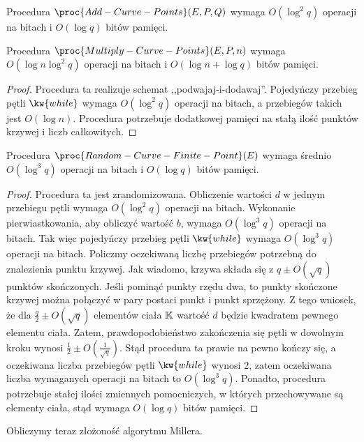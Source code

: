 \begin{fact}
Procedura $\proc{Add-Curve-Points}(E, P, Q)$ wymaga
$O(\log^2 q)$ operacji na bitach i $O(\log q)$ bitów pamięci.
\end{fact}

\begin{lemma}
Procedura $\proc{Multiply-Curve-Points}(E, P, n)$ wymaga
$O(\log n \log^2 q)$ operacji na bitach i $O(\log n + \log q)$ bitów pamięci.
\end{lemma}

\begin{proof}
Procedura ta realizuje schemat ,,podwajaj-i-dodawaj''.
Pojedyńczy przebieg pętli $\kw{while}$ wymaga
$O(\log^2 q)$ operacji na bitach,
a przebiegów takich jest $O(\log n)$.
Procedura potrzebuje dodatkowej pamięci na stałą ilość
punktów krzywej i liczb całkowitych.
\end{proof}

\begin{lemma}
Procedura $\proc{Random-Curve-Finite-Point}(E)$ wymaga
średnio $O(\log^3 q)$ operacji na bitach i $O(\log q)$ bitów pamięci.
\end{lemma}

\begin{proof}
Procedura ta jest zrandomizowana.
Obliczenie wartości $d$ w jednym przebiegu pętli wymaga
$O(\log^2 q)$ operacji na bitach.
Wykonanie pierwiastkowania, aby obliczyć wartość $b$, wymaga
$O(\log^3 q)$ operacji na bitach.
Tak więc pojedyńczy przebieg pętli $\kw{while}$ wymaga
$O(\log^3 q)$ operacji na bitach.
Policzmy oczekiwaną liczbę przebiegów potrzebną do znalezienia punktu krzywej.
Jak wiadomo, krzywa składa się z $q \pm O(\sqrt{q})$ punktów skończonych.
Jeśli pominąć punkty rzędu dwa,
to punkty skończone krzywej można połączyć w pary postaci
punkt i punkt sprzężony.
Z tego wniosek, że dla $\frac{q}{2} \pm O(\sqrt{q})$ elementów ciała $\mathbb{K}$
wartość $d$ będzie kwadratem pewnego elementu ciała.
Zatem, prawdopodobieństwo zakończenia się pętli w dowolnym kroku
wynosi $\frac{1}{2} \pm O(\frac{1}{\sqrt{q}})$.
Stąd procedura ta prawie na pewno kończy się,
a oczekiwana liczba przebiegów pętli $\kw{while}$ wynosi $2$,
zatem oczekiwana liczba wymaganych operacji na bitach to $O(\log^3 q)$.
Ponadto, procedura potrzebuje stałej ilości zmiennych pomocniczych,
w których przechowywane są elementy ciała,
stąd wymaga $O(\log q)$ bitów pamięci.
\end{proof}

Obliczymy teraz złożoność algorytmu Millera.

